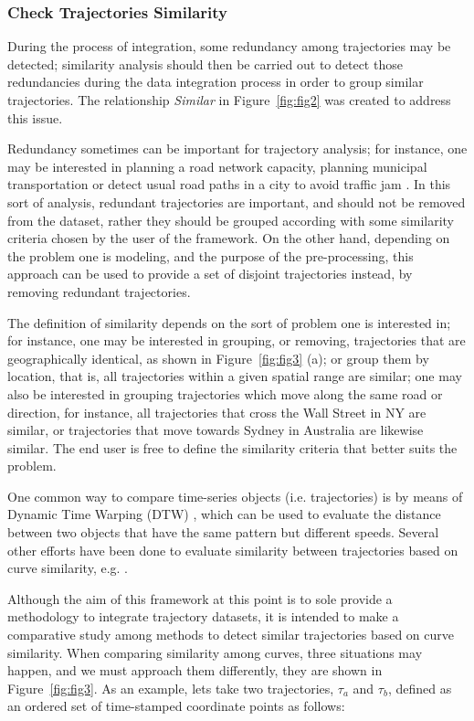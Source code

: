 \documentclass[a4paper,12pt]{article}
\begin{document}
\subsubsection{Check Trajectories Similarity}\label{sec:similarity}
During the process of integration, some redundancy among trajectories may be detected; similarity analysis should then be carried out to detect those redundancies during the data integration process in order to group similar trajectories. The relationship \textit{Similar} in Figure~\ref{fig:fig2} was created to address this issue.

Redundancy sometimes can be important for trajectory analysis; for instance, one may be interested in planning a road network capacity, planning municipal transportation or detect usual road paths in a city to avoid traffic jam \cite{deAquino2013}. In this sort of analysis, redundant trajectories are important, and should not be removed from the dataset, rather they should be grouped according with some similarity criteria chosen by the user of the framework. On the other hand, depending on the problem one is modeling, and the purpose of the pre-processing, this approach can be used to provide a set of disjoint trajectories instead, by removing redundant trajectories.

The definition of similarity depends on the sort of problem one is interested in; for instance, one may be interested in grouping, or removing, trajectories that are geographically identical, as shown in Figure~\ref{fig:fig3} (a); or group them by location, that is, all trajectories within a given spatial range are similar; one may also be interested in grouping trajectories which move along the same road or direction, for instance, all trajectories that cross the Wall Street in NY are similar, or trajectories that move towards Sydney in Australia are likewise similar. The end user is free to define the similarity criteria that better suits the problem. 

One common way to compare time-series objects (i.e. trajectories) is by means of Dynamic Time Warping (DTW) \cite{berndt94}, which can be used to evaluate the distance between two objects that have the same pattern but different speeds. Several other efforts have been done to evaluate similarity between trajectories based on curve similarity, e.g. \cite{buchin2009}\cite{liu2012}\cite{sankararaman2013}\cite{siirtola2008} \cite{tiakas2009}\cite{vanKreveld2007}\cite{vlachos2002ICDE}\cite{vlachos2002DEXA}. 

Although the aim of this framework at this point is to sole provide a methodology to integrate trajectory datasets, it is intended to make a comparative study among methods to detect similar trajectories based on curve similarity. When comparing similarity among curves, three situations may happen, and we must approach them differently, they are shown in Figure~\ref{fig:fig3}. As an example, lets take two trajectories, $\tau_a$ and $\tau_b$, defined as an ordered set of time-stamped coordinate points as follows:
\end{document}
